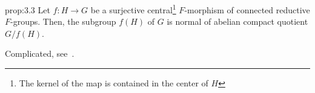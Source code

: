 \documentclass{article}
\begin{document}
\begin{prop}{}{prop:3.3}
    Let $f : H \to G$ be a surjective central\footnote{The kernel of the map is contained in the center of $H$} $F$-morphism of connected reductive $F$-groups. Then, the subgroup $f(H)$ of $G$ is normal of abelian compact quotient $G/f(H)$.
\end{prop}

\begin{Proof}
  Complicated, see~\cite{henniartRepresentationsSL2F2025}.

\end{Proof}
\end{document}
